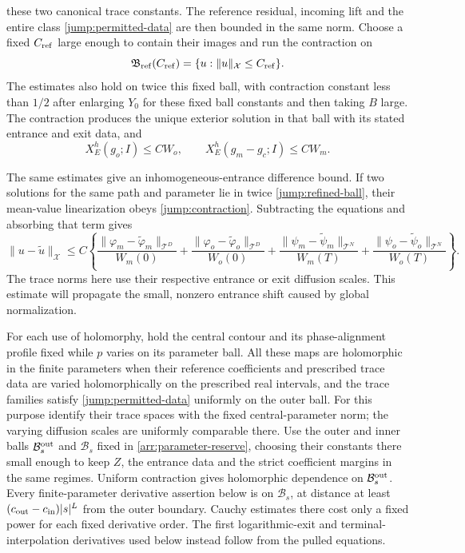 these two canonical trace constants.  The reference residual,
incoming lift and the entire class \eqref{jump:permitted-data}
are then bounded in the same norm.  Choose a fixed
$C_{\rm ref}$ large enough to contain their images and run the
contraction on
\begin{equation}\label{jump:refined-ball}
 \mathfrak B_{\rm ref}(C_{\rm ref})
       =\{u:\|u\|_{\mathcal X}\leq C_{\rm ref}\}.
\end{equation}
The estimates also hold on twice this fixed ball, with contraction
constant less than $1/2$ after enlarging $Y_0$ for these fixed
ball constants and then taking $B$ large.  The
contraction produces the unique exterior solution in that ball
with its stated entrance and exit data, and
\begin{equation}\label{jump:refined-bounds}
 X_E^h(g_o;I)\leq CW_o,
 \qquad X_E^h(g_m-g_c;I)\leq CW_m.
\end{equation}

The same estimates give an inhomogeneous-entrance difference bound.
If two solutions for the same path and parameter lie in twice
\eqref{jump:refined-ball}, their
mean-value linearization obeys \eqref{jump:contraction}.  Subtracting
the equations and absorbing that term gives
\begin{equation}\label{jump:refined-difference}
 \|u-\widetilde u\|_{\mathcal X}\leq C\left\{
 \frac{\|\varphi_m-\widetilde\varphi_m\|_{\mathcal T^D}}{W_m(0)}
 +\frac{\|\varphi_o-\widetilde\varphi_o\|_{\mathcal T^D}}{W_o(0)}
 +\frac{\|\psi_m-\widetilde\psi_m\|_{\mathcal T^N}}{W_m(T)}
 +\frac{\|\psi_o-\widetilde\psi_o\|_{\mathcal T^N}}{W_o(T)}
 \right\}.
\end{equation}
The trace norms here use their respective entrance or exit diffusion
scales.  This estimate will propagate the small, nonzero entrance
shift caused by global normalization.

For each use of holomorphy, hold the central contour and its
phase-alignment profile fixed while $p$ varies on its parameter ball.
All these maps are holomorphic in the finite parameters when their
reference coefficients and prescribed trace data are varied
holomorphically on the prescribed real intervals, and the trace
families satisfy \eqref{jump:permitted-data} uniformly on the
outer ball.  For this purpose identify their trace spaces with
the fixed central-parameter norm; the varying diffusion scales
are uniformly comparable there.  Use the outer and inner balls
$\mathcal B_s^{\rm out}$ and $\mathcal B_s$ fixed in
\eqref{arr:parameter-reserve}, choosing their constants there
small enough to keep $Z$, the entrance data and the strict
coefficient margins in the same regimes.  Uniform contraction
gives holomorphic dependence on $\mathcal B_s^{\rm out}$.
Every finite-parameter derivative assertion below is on
$\mathcal B_s$, at distance at least
$(c_{\rm out}-c_{\rm in})|s|^L$ from the outer boundary.
Cauchy estimates there
cost only a fixed power for each fixed derivative order.  The first
logarithmic-exit and terminal-interpolation derivatives used below
instead follow from the pulled equations.

